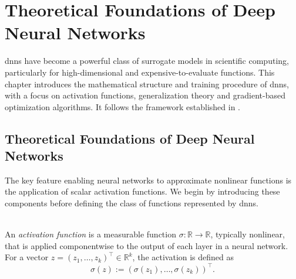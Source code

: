 \chapter{Theoretical Foundations of Deep Neural Networks}
\label{chapter:dnn-theory}

\acfp{dnn} have become a powerful class of surrogate models in scientific
computing, particularly for high-dimensional and expensive-to-evaluate
functions. This chapter introduces the mathematical structure and training
procedure of \acp{dnn}, with a focus on activation functions, generalization
theory and gradient-based optimization algorithms. It follows the framework
established in \cite{mishra2021enhancing}.

\section{Theoretical Foundations of Deep Neural Networks}
\label{sec:dnn-definition}

The key feature enabling neural networks to approximate nonlinear functions is
the application of scalar activation functions. We begin by introducing these
components before defining the class of functions represented by \aclp{dnn}.

\begin{definition} \ \\
An \emph{activation function} is a measurable function $\sigma : \mathbb{R} \to
\mathbb{R}$, typically nonlinear, that is applied componentwise to the output of
each layer in a neural network. For a vector $z = (z_1, \dots, z_k)^\top \in
\mathbb{R}^k$, the activation is defined as
\begin{equation*}
    \sigma(z) := (\sigma(z_1), \dots, \sigma(z_k))^\top.
\end{equation*}
\end{definition}

